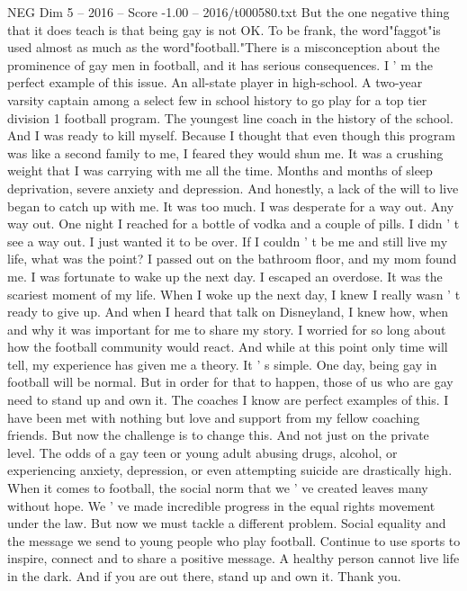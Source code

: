 \begin{textsample}{NEG Dim 5 – 2016 – Score -1.00 – 2016/t000580.txt}
But the one negative thing that it does teach is that being gay is not OK.
To be frank, the word"faggot"is used almost as much as the word"football."There is a misconception about the prominence of gay men in football, and it has serious consequences.
I ' m the perfect example of this issue.
An all-state player in high-school.
A two-year varsity captain among a select few in school history to go play for a top tier division 1 football program.
The youngest line coach in the history of the school.
And I was ready to kill myself.
Because I thought that even though this program was like a second family to me, I feared they would shun me.
It was a crushing weight that I was carrying with me all the time.
Months and months of sleep deprivation, severe anxiety and depression.
And honestly, a lack of the will to live began to catch up with me.
It was too much.
I was desperate for a way out.
Any way out.
One night I reached for a bottle of vodka and a couple of pills.
I didn ' t see a way out.
I just wanted it to be over.
If I couldn ' t be me and still live my life, what was the point?
I passed out on the bathroom floor, and my mom found me.
I was fortunate to wake up the next day.
I escaped an overdose.
It was the scariest moment of my life.
When I woke up the next day, I knew I really wasn ' t ready to give up.
And when I heard that talk on Disneyland, I knew how, when and why it was important for me to share my story.
I worried for so long about how the football community would react.
And while at this point only time will tell, my experience has given me a theory.
It ' s simple.
One day, being gay in football will be normal.
But in order for that to happen, those of us who are gay need to stand up and own it.
The coaches I know are perfect examples of this.
I have been met with nothing but love and support from my fellow coaching friends.
But now the challenge is to change this.
And not just on the private level.
The odds of a gay teen or young adult abusing drugs, alcohol, or experiencing anxiety, depression, or even attempting suicide are drastically high.
When it comes to football, the social norm that we ' ve created leaves many without hope.
We ' ve made incredible progress in the equal rights movement under the law.
But now we must tackle a different problem.
Social equality and the message we send to young people who play football.
Continue to use sports to inspire, connect and to share a positive message.
A healthy person cannot live life in the dark.
And if you are out there, stand up and own it.
Thank you.

\end{textsample}
